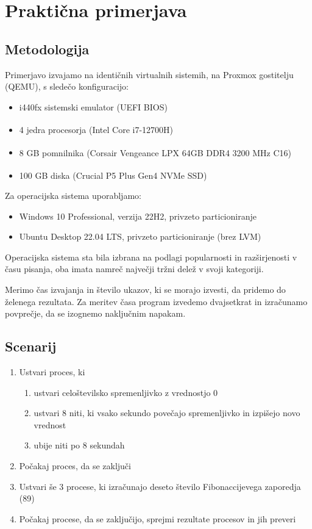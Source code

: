 \documentclass[a4paper,12pt,openright]{book}
\begin{document}
\section{Praktična primerjava}

\subsection{Metodologija} \label{ssec:process_control:methodology}

Primerjavo izvajamo na identičnih virtualnih sistemih, na Proxmox gostitelju (QEMU), s sledečo konfiguracijo:
\begin{itemize}
	\item i440fx sistemski emulator (UEFI BIOS)
	\item 4 jedra procesorja (Intel\textsuperscript{\textregistered} Core\textsuperscript{\texttrademark} i7-12700H)
	\item 8 GB pomnilnika (Corsair\textsuperscript{\textregistered} Vengeance\textsuperscript{\textregistered} LPX 64GB DDR4 3200 MHz C16)
	\item 100 GB diska (Crucial\textsuperscript{\textregistered} P5 Plus Gen4 NVMe SSD)
\end{itemize}

Za operacijska sistema uporabljamo:
\begin{itemize}
	\item Windows 10 Professional, verzija 22H2, privzeto particioniranje
	\item Ubuntu Desktop 22.04 LTS, privzeto particioniranje (brez LVM)
\end{itemize}
Operacijska sistema sta bila izbrana na podlagi popularnosti in razširjenosti v času pisanja, oba imata namreč največji tržni delež v svoji kategoriji.

Merimo čas izvajanja in število ukazov, ki se morajo izvesti, da pridemo do želenega rezultata.
Za meritev časa program izvedemo dvajsetkrat in izračunamo povprečje, da se izognemo naključnim napakam.

\subsection{Scenarij}

\begin{enumerate}
	\item Ustvari proces, ki
	      \begin{enumerate}
	      	\item ustvari celoštevilsko spremenljivko z vrednostjo 0
	      	\item ustvari 8 niti, ki vsako sekundo povečajo spremenljivko in izpišejo novo vrednost
	      	\item ubije niti po 8 sekundah
	      \end{enumerate}
	\item Počakaj proces, da se zaključi
	\item Ustvari še 3 procese, ki izračunajo deseto število Fibonaccijevega zaporedja (89)
	\item Počakaj procese, da se zaključijo, sprejmi rezultate procesov in jih preveri
\end{enumerate}
\end{document}
